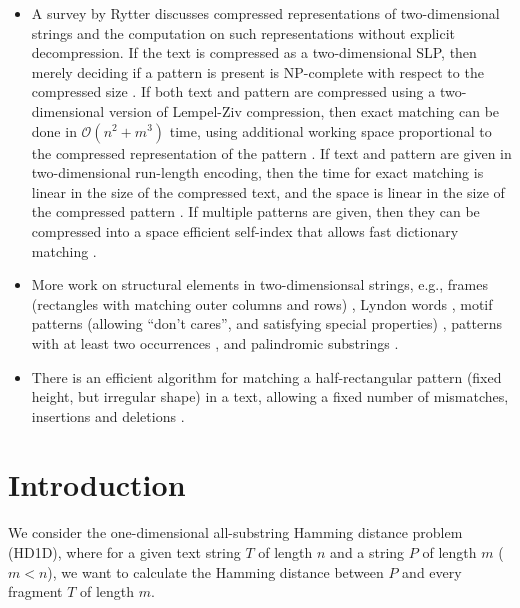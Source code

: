 \documentclass[11pt]{article}
\renewcommand{\O}{\mathcal{O}}
\theoremstyle{plain}
\theoremstyle{definition}
\theoremstyle{remark}
\newcommand{\jonas}[2][]{\todo[color=green!40, #1]{\textbf{J:} #2}}
\newcommand{\jonasi}[2][]{\jonas[inline, #1]{#2}}
\begin{document}
\begin{itemize}
	\item A survey by Rytter \cite{Rytter2000} discusses compressed representations of two-dimensional strings and the computation on such representations without explicit decompression. If the text is compressed as a two-dimensional SLP, then merely deciding if a pattern is present is NP-complete with respect to the compressed size \cite{Berman2002}. If both text and pattern are compressed using a two-dimensional version of Lempel-Ziv compression, then exact matching can be done in $\O(n^2 + m^3)$ time, using additional working space proportional to the compressed representation of the pattern \cite{Amir2003}. If text and pattern are given in two-dimensional run-length encoding, then the time for exact matching is linear in the size of the compressed text, and the space is linear in the size of the compressed pattern \cite{Amir2003a}. If multiple patterns are given, then they can be compressed into a space efficient self-index that allows fast dictionary matching \cite{Neuburger2013}.
	\item More work on structural elements in two-dimensionsal strings, e.g., frames (rectangles with matching outer columns and rows) \cite{Boneh2023}, Lyndon words \cite{Marcus2017}, motif patterns (allowing ``don't cares'', and satisfying special properties) \cite{Apostolico2008}, patterns with at least two occurrences \cite{Karp1972}, and palindromic substrings \cite{Mahalingam2019}.
	\item There is an efficient algorithm for matching a half-rectangular pattern (fixed height, but irregular shape) in a text, allowing a fixed number of mismatches, insertions and deletions \cite{Amir1995}.
\end{itemize}


\jonasi{work in progress, unfinished $\uparrow$}



\section{Introduction}

\newcommand{\hd}{\textsc{HD1D}\xspace}
\newcommand{\HD}{\textsc{HD2D}\xspace}

We consider the one-dimensional all-substring Hamming distance problem (\hd), where for a given text string $T$ of length $n$ and a string $P$ of length $m$ ($m < n$), we want to calculate the Hamming distance between $P$ and every fragment $T$ of length $m$.
\end{document}
